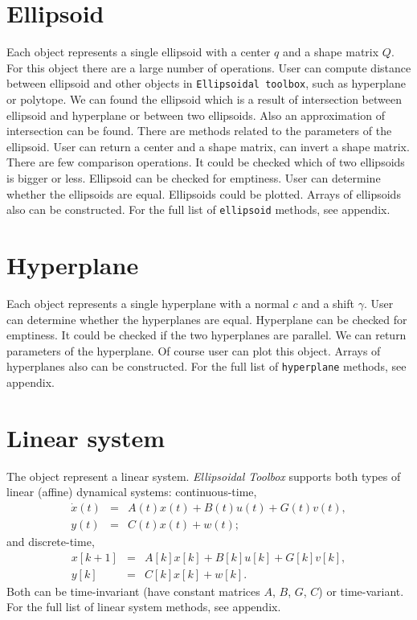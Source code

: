 \section{Ellipsoid}
Each object represents a single ellipsoid with a center $q$ and a shape matrix $Q$.
For this object there are a large number of operations. User can compute distance
between ellipsoid and other objects in {\tt Ellipsoidal toolbox}, such as hyperplane
or polytope. We can found the ellipsoid which is a result of intersection between ellipsoid
and hyperplane or between two ellipsoids. Also an approximation of intersection can be found.
There are methods related to the parameters of the ellipsoid. User can return a center and
a shape matrix, can invert a shape matrix.
There are few comparison operations. It could be checked which of two ellipsoids is bigger
or less. Ellipsoid can be checked for emptiness. User can determine whether the 
ellipsoids are equal. Ellipsoids could be plotted.
Arrays of ellipsoids also can be constructed.
For the full list of {\tt ellipsoid} methods, see appendix.

\section{Hyperplane}
Each object represents a single hyperplane with a normal $c$ and a shift $\gamma$.
User can determine whether the hyperplanes are equal. Hyperplane can be checked 
for emptiness. It could be checked if the two hyperplanes are parallel.
We can return parameters of the hyperplane. Of course user can plot this object.
Arrays of hyperplanes also can be constructed.
For the full list of {\tt hyperplane} methods, see appendix.

\section{Linear system}
The object represent a linear system. {\it Ellipsoidal Toolbox} supports both
types of linear (affine) dynamical systems: continuous-time,
\begin{eqnarray*}
\dot{x}(t) & = & A(t)x(t) + B(t)u(t) + G(t)v(t),\\
y(t) & = & C(t)x(t) + w(t);
\end{eqnarray*}
and discrete-time,
\begin{eqnarray*}
x[k+1] & = & A[k]x[k] + B[k]u[k] + G[k]v[k], \\
y[k] & = & C[k]x[k] + w[k].
\end{eqnarray*}
Both can be time-invariant (have constant matrices $A$, $B$, $G$, $C$)
or time-variant.
For the full list of linear system methods, see appendix.



